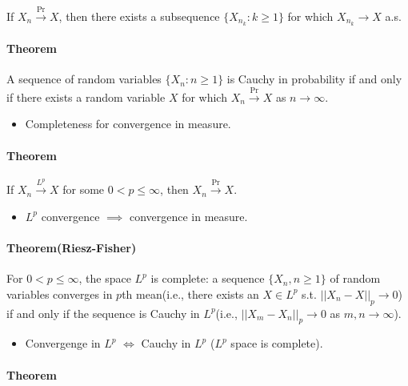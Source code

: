\documentclass[]{article}
\providecommand{\tightlist}{%
  \setlength{\itemsep}{0pt}\setlength{\parskip}{0pt}}
\let\oldparagraph\paragraph
\renewcommand{\paragraph}[1]{\oldparagraph{#1}\mbox{}}
\begin{document}
If \(X_n\stackrel{\text{Pr}}\rightarrow X\), then there exists a
subsequence \(\{X_{n_k}:k\ge 1\}\) for which \(X_{n_k}\rightarrow X\)
a.s.

\hypertarget{theorem-2}{%
\paragraph{Theorem}\label{theorem-2}}

A sequence of random variables \(\{X_n:n\ge 1\}\) is Cauchy in
probability if and only if there exists a random variable \(X\) for
which \(X_n\stackrel{\text{Pr}}\rightarrow X\) as
\(n\rightarrow \infty\).

\begin{itemize}
\tightlist
\item
  Completeness for convergence in measure.
\end{itemize}

\hypertarget{theorem-3}{%
\paragraph{Theorem}\label{theorem-3}}

If \(X_n\stackrel{L^p}\rightarrow X\) for some \(0<p\le \infty\), then
\(X_n\stackrel{\text{Pr}}\rightarrow X\).

\begin{itemize}
\tightlist
\item
  \(L^p\) convergence \(\implies\) convergence in measure.
\end{itemize}

\hypertarget{theoremriesz-fisher}{%
\paragraph{Theorem(Riesz-Fisher)}\label{theoremriesz-fisher}}

For \(0<p\le\infty\), the space \(L^p\) is complete: a sequence
\(\{X_n,n\ge 1\}\) of random variables converges in \(p\)th mean(i.e.,
there exists an \(X\in L^p\) s.t. \(||X_n-X||_p\rightarrow 0\)) if and
only if the sequence is Cauchy in \(L^p\)(i.e.,
\(||X_m-X_n||_p\rightarrow 0\) as \(m,n\rightarrow \infty\)).

\begin{itemize}
\tightlist
\item
  Convergenge in \(L^p\) \(\iff\) Cauchy in \(L^p\) (\(L^p\) space is
  complete).
\end{itemize}

\hypertarget{theorem-4}{%
\paragraph{Theorem}\label{theorem-4}}
\end{document}

